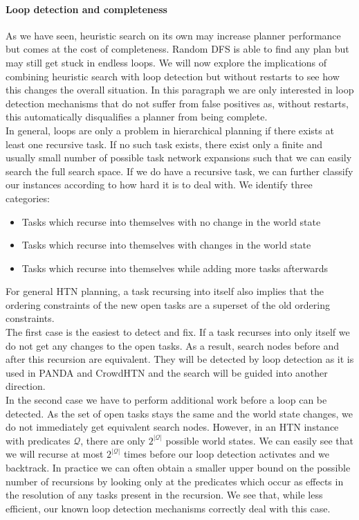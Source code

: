 \paragraph{Loop detection and completeness}
\label{improv: loops and completeness}
As we have seen, heuristic search on its own may increase planner performance but comes at the cost of completeness. Random DFS is able to find any plan but may still get stuck in endless loops. We will now explore the implications of combining heuristic search with loop detection but without restarts to see how this changes the overall situation. In this paragraph we are only interested in loop detection mechanisms that do not suffer from false positives as, without restarts, this automatically disqualifies a planner from being complete.\\
In general, loops are only a problem in hierarchical planning if there exists at least one recursive task. If no such task exists, there exist only a finite and usually small number of possible task network expansions such that we can easily search the full search space. If we do have a recursive task, we can further classify our instances according to how hard it is to deal with. We identify three categories:
\begin{itemize}
	\item Tasks which recurse into themselves with no change in the world state
	\item Tasks which recurse into themselves with changes in the world state
	\item Tasks which recurse into themselves while adding more tasks afterwards
\end{itemize}
For general HTN planning, a task recursing into itself also implies that the ordering constraints of the new open tasks are a superset of the old ordering constraints. \\
The first case is the easiest to detect and fix. If a task recurses into only itself we do not get any changes to the open tasks. As a result, search nodes before and after this recursion are equivalent. They will be detected by loop detection as it is used in PANDA and CrowdHTN and the search will be guided into another direction. \\
In the second case we have to perform additional work before a loop can be detected. As the set of open tasks stays the same and the world state changes, we do not immediately get equivalent search nodes. However, in an HTN instance with predicates $\mathcal{Q}$, there are only $2^{|\mathcal{Q}|}$ possible world states. We can easily see that we will recurse at most $2^{|\mathcal{Q}|}$ times before our loop detection activates and we backtrack. In practice we can often obtain a smaller upper bound on the possible number of recursions by looking only at the predicates which occur as effects in the resolution of any tasks present in the recursion. We see that, while less efficient, our known loop detection mechanisms correctly deal with this case. \\
